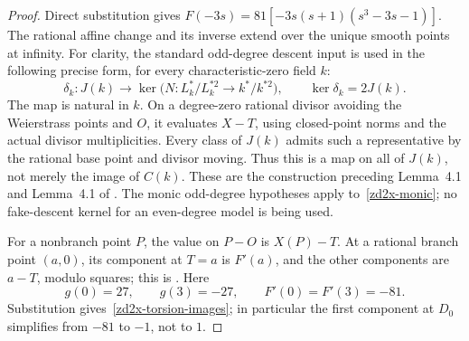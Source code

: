 \begin{proof}
Direct substitution gives \(F(-3s)=81[-3s(s+1)(s^3-3s-1)]\).
The rational affine change and its inverse extend over the unique
smooth points at infinity. For clarity, the standard odd-degree
descent input is used in the following precise form, for every
characteristic-zero field \(k\):
\begin{equation}
 \delta_k:J(k)\longrightarrow
 \ker\bigl(N:L_k^*/L_k^{*2}\longrightarrow k^*/k^{*2}\bigr),
 \qquad \ker\delta_k=2J(k).
 \label{zd2x-delta-kernel}
\end{equation}
The map is natural in \(k\). On a degree-zero rational divisor
avoiding the Weierstrass points and \(O\), it evaluates \(X-T\),
using closed-point norms and the actual divisor multiplicities.
Every class of \(J(k)\) admits such a representative by the
rational base point and divisor moving. Thus this is a map on
all of \(J(k)\), not merely the image of \(C(k)\).
These are the construction preceding Lemma~4.1 and Lemma~4.1 of
\cite{StollTwoDescent2001}. The monic odd-degree hypotheses
apply to~\eqref{zd2x-monic}; no fake-descent kernel for an
even-degree model is being used.

For a nonbranch point \(P\), the value on \(P-O\) is \(X(P)-T\).
At a rational branch point \((a,0)\), its component at \(T=a\)
is \(F'(a)\), and the other components are \(a-T\), modulo
squares; this is \cite[Lemma~4.3]{StollTwoDescent2001}.
Here
\[
 g(0)=27,\qquad g(3)=-27,\qquad F'(0)=F'(3)=-81.
\]
Substitution gives~\eqref{zd2x-torsion-images}; in particular
the first component at \(D_0\) simplifies from \(-81\) to
\(-1\), not to \(1\).
\end{proof}

